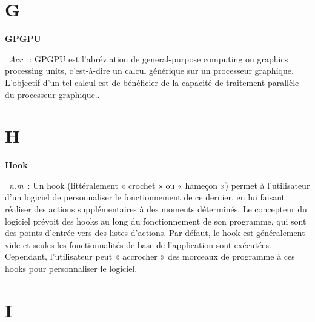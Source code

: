 \documentclass[10pt,a4paper,twoside]{article} %
\newcommand{\entry}[3]{\textbf{#1}\markboth{#1}{#1}\  \textit{#2}\ :  {#3}} %
\begin{document}

\section*{G}

\begin{multicols}{2}
\entry{GPGPU}{Acr.}{GPGPU est l'abréviation de general-purpose computing on graphics processing units, c'est-à-dire un calcul générique sur un processeur graphique. L'objectif d'un tel calcul est de bénéficier de la capacité de traitement parallèle du processeur graphique..}

\end{multicols}


\section*{H}

\begin{multicols}{2}

\entry{Hook}{n.m}{Un hook (littéralement « crochet » ou « hameçon ») permet à l'utilisateur d'un logiciel de personnaliser le fonctionnement de ce dernier, en lui faisant réaliser des actions supplémentaires à des moments déterminés. Le concepteur du logiciel prévoit des hooks au long du fonctionnement de son programme, qui sont des points d'entrée vers des listes d'actions. Par défaut, le hook est généralement vide et seules les fonctionnalités de base de l'application sont exécutées. Cependant, l'utilisateur peut « accrocher » des morceaux de programme à ces hooks pour personnaliser le logiciel.}

\end{multicols}


\section*{I}
\end{document}

